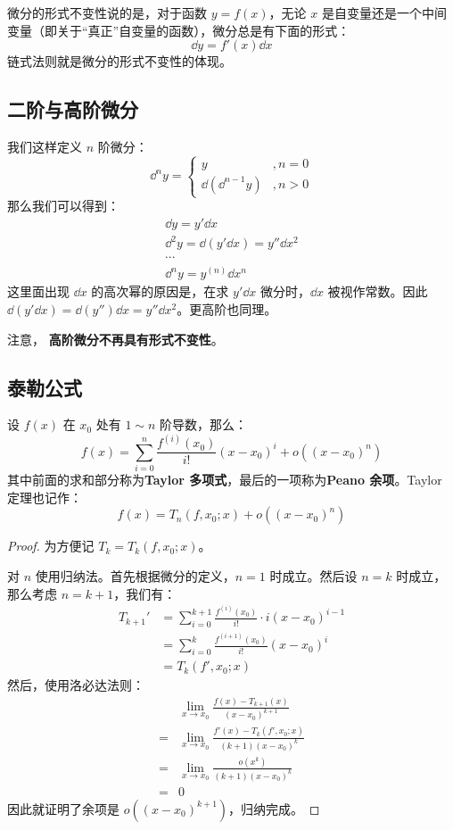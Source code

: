 微分的形式不变性说的是，对于函数 $y = f(x)$，无论 $x$ 是自变量还是一个中间变量（即关于“真正”自变量的函数），微分总是有下面的形式：
$$
\dd y = f'(x) \dd x
$$
链式法则就是微分的形式不变性的体现。

\subsection{二阶与高阶微分}

\begin{definition}[函数的高阶微分]
	我们这样定义 $n$ 阶微分：
	$$
	\dd^n y = 
	\begin{cases}
		y & , n = 0 \\
		\dd (\dd^{n-1} y) & , n > 0
	\end{cases}
	$$
	那么我们可以得到：
	$$
	\begin{gathered}
		\dd y = y' \dd x \\
		\dd^2 y = \dd (y' \dd x) = y'' \dd x^2 \\
		\cdots \\
		\dd^n y = y^{(n)} \dd x^n
	\end{gathered}
	$$
	这里面出现 $\dd x$ 的高次幂的原因是，在求 $y' \dd x$ 微分时，$\dd x$ 被视作常数。因此 $\dd(y' \dd x) = \dd(y'') \dd x = y'' \dd x^2$。更高阶也同理。
\end{definition}

注意， \textbf{高阶微分不再具有形式不变性}。

\subsection{泰勒公式}

\begin{theorem}[Taylor 定理]
	设 $f(x)$ 在 $x_0$ 处有 $1 \sim n$ 阶导数，那么：
	$$
	f(x) = \sum_{i=0}^n \frac{f^{(i)}(x_0)}{i!} (x - x_0)^i + o((x - x_0)^n)
	$$
	其中前面的求和部分称为\textbf{Taylor 多项式}，最后的一项称为\textbf{Peano 余项}。Taylor 定理也记作：
	$$
	f(x) = T_n(f, x_0; x) + o((x - x_0)^n)
	$$

	\begin{proof}
		为方便记 $T_k = T_k(f, x_0; x)$。

		对 $n$ 使用归纳法。首先根据微分的定义，$n = 1$ 时成立。然后设 $n = k$ 时成立，那么考虑 $n = k + 1$，我们有：
		$$
		\begin{aligned}
			T_{k+1}' & = \sum_{i=0}^{k+1} \frac{f^{(i)}(x_0)}{i!} \cdot i (x - x_0)^{i-1} \\
			& = \sum_{i=0}^k \frac{f^{(i+1)}(x_0)}{i!} (x - x_0)^i \\
			& = T_k(f', x_0; x)
		\end{aligned}
		$$
		然后，使用洛必达法则：
		$$
		\begin{aligned}
			& \lim_{x \to x_0} \frac{f(x) - T_{k+1}(x)}{(x - x_0)^{k+1}} \\
			= & \lim_{x \to x_0} \frac{f'(x) - T_{k}(f', x_0; x)}{(k+1) (x - x_0)^k} \\
			= & \lim_{x \to x_0} \frac{o(x^k)}{(k+1) (x - x_0)^k} \\
			= & 0
		\end{aligned}
		$$
		因此就证明了余项是 $o((x - x_0)^{k+1})$，归纳完成。
	\end{proof}
\end{theorem}

